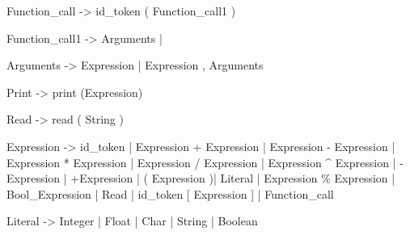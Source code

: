 Function_call -> id_token ( Function_call1 )

Function_call1 -> Arguments | \epsilon

Arguments -> Expression | Expression , Arguments

Print -> print (Expression)

Read -> read ( String )

Expression -> id_token | Expression + Expression | Expression - Expression | Expression * Expression | Expression / Expression | Expression ^ Expression | -Expression | +Expression | ( Expression )| Literal | Expression \% Expression | Bool_Expression | Read | id_token [ Expression ] | Function_call %


Literal -> Integer | Float | Char | String | Boolean

